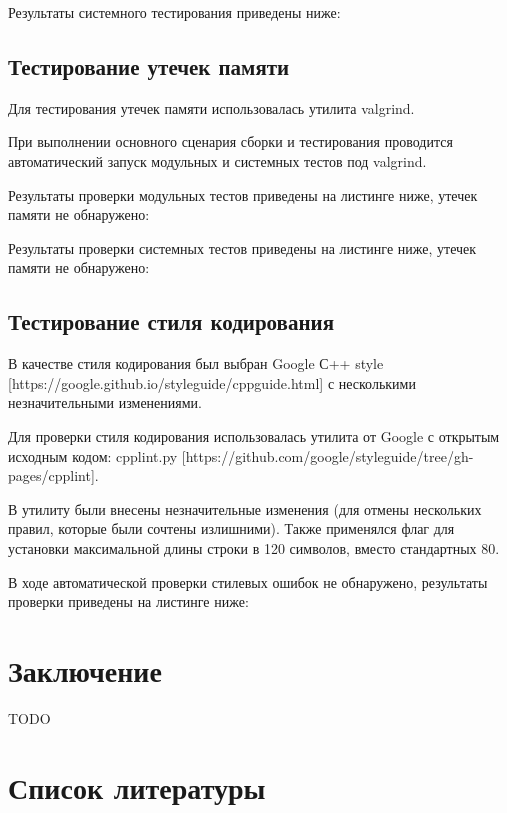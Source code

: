 \documentclass[a4paper,12pt]{report}
\begin{document}
Результаты системного тестирования приведены ниже:


\section{Тестирование утечек памяти}
Для тестирования утечек памяти использовалась утилита valgrind.

При выполнении основного сценария сборки и тестирования проводится автоматический запуск модульных и системных тестов под valgrind. 

Результаты проверки модульных тестов приведены на листинге ниже, утечек памяти не обнаружено: 



Результаты проверки системных тестов приведены на листинге ниже, утечек памяти не обнаружено: 



\section{Тестирование стиля кодирования}

В качестве стиля кодирования был выбран Google С++ style [https://google.github.io/styleguide/cppguide.html] с несколькими незначительными изменениями. 
 
Для проверки стиля кодирования использовалась утилита от Google с открытым исходным кодом: cpplint.py [https://github.com/google/styleguide/tree/gh-pages/cpplint]. 

В утилиту были внесены незначительные изменения (для отмены нескольких правил, которые были сочтены излишними). Также применялся флаг для установки максимальной длины строки в 120 символов, вместо стандартных 80.

В ходе автоматической проверки стилевых ошибок не обнаружено, результаты проверки приведены на листинге ниже: 


\clearpage
\chapter*{Заключение}

TODO

\newpage
\chapter*{Список литературы}
\end{document}
